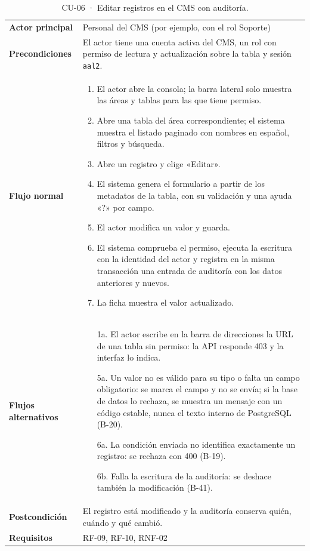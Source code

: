 {\footnotesize
\begin{xltabular}{\textwidth}{@{}>{\bfseries}p{2.6cm}X@{}}
  \caption{CU-06 · Editar registros en el CMS con auditoría.}\label{tab:ana-cu06}\\
    \toprule
    Actor principal & Personal del CMS (por ejemplo, con el rol Soporte) \\
    Precondiciones & El actor tiene una cuenta activa del CMS, un rol con permiso de lectura y actualización sobre la tabla y sesión \texttt{aal2}. \\
    \midrule
    Flujo normal &
      \begin{enumerate}[nosep,leftmargin=*]
        \item El actor abre la consola; la barra lateral solo muestra las áreas y tablas para las que tiene permiso.
        \item Abre una tabla del área correspondiente; el sistema muestra el listado paginado con nombres en español, filtros y búsqueda.
        \item Abre un registro y elige «Editar».
        \item El sistema genera el formulario a partir de los metadatos de la tabla, con su validación y una ayuda «?» por campo.
        \item El actor modifica un valor y guarda.
        \item El sistema comprueba el permiso, ejecuta la escritura con la identidad del actor y registra en la misma transacción una entrada de auditoría con los datos anteriores y nuevos.
        \item La ficha muestra el valor actualizado.
      \end{enumerate} \\
    \midrule
    Flujos alternativos &
      \begin{itemize}[nosep,leftmargin=*]
        \item[1a.] El actor escribe en la barra de direcciones la URL de una tabla sin permiso: la API responde 403 y la interfaz lo indica.
        \item[5a.] Un valor no es válido para su tipo o falta un campo obligatorio: se marca el campo y no se envía; si la base de datos lo rechaza, se muestra un mensaje con un código estable, nunca el texto interno de PostgreSQL (B-20).
        \item[6a.] La condición enviada no identifica exactamente un registro: se rechaza con 400 (B-19).
        \item[6b.] Falla la escritura de la auditoría: se deshace también la modificación (B-41).
      \end{itemize} \\
    \midrule
    Postcondición & El registro está modificado y la auditoría conserva quién, cuándo y qué cambió. \\
    Requisitos & RF-09, RF-10, RNF-02 \\
    \bottomrule
\end{xltabular}}

